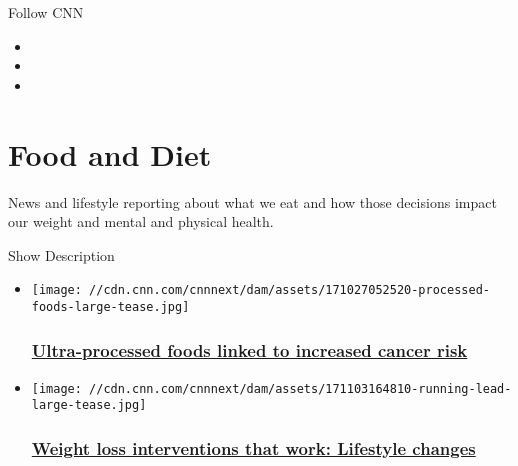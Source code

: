 Follow CNN

\begin{itemize}
\item
\item
\item
\end{itemize}

\hypertarget{food-and-diet}{%
\section{Food and Diet}\label{food-and-diet}}

News and lifestyle reporting about what we eat and how those decisions
impact our weight and mental and physical health.

Show Description

\begin{itemize}
\item
  \href{/2018/02/14/health/ultra-processed-foods-cancer-study/index.html}{}

  \texttt{[image: //cdn.cnn.com/cnnnext/dam/assets/171027052520-processed-foods-large-tease.jpg]}

  \hypertarget{ultra-processed-foods-linked-to-increased-cancer-risk}{%
  \subsubsection{\texorpdfstring{\href{/2018/02/14/health/ultra-processed-foods-cancer-study/index.html}{Ultra-processed
  foods linked to increased cancer
  risk}}{Ultra-processed foods linked to increased cancer risk}}\label{ultra-processed-foods-linked-to-increased-cancer-risk}}
\end{itemize}

\begin{itemize}
\item
  \href{/2018/02/07/health/weight-loss-food-exercise-drayer/index.html}{}

  \texttt{[image: //cdn.cnn.com/cnnnext/dam/assets/171103164810-running-lead-large-tease.jpg]}

  \hypertarget{weight-loss-interventions-that-work-lifestyle-changes-}{%
  \subsubsection{\texorpdfstring{\href{/2018/02/07/health/weight-loss-food-exercise-drayer/index.html}{Weight
  loss interventions that work: Lifestyle changes
  }}{Weight loss interventions that work: Lifestyle changes }}\label{weight-loss-interventions-that-work-lifestyle-changes-}}
\end{itemize}


